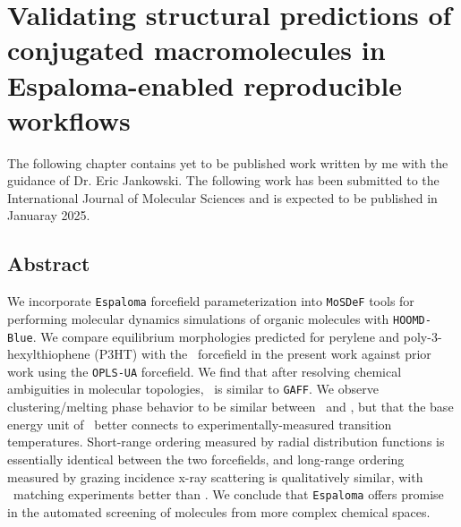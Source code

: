 \chapter{Validating structural predictions of conjugated macromolecules in Espaloma-enabled reproducible workflows}
The following chapter contains yet to be published work written by me with the guidance of Dr. Eric Jankowski. The following work has been submitted to the International Journal of Molecular Sciences and is expected to be published in Januaray 2025.
\label{chap:EspVal}

\section{Abstract}
We incorporate \texttt{Espaloma} forcefield parameterization into  \texttt{MoSDeF} tools for performing molecular dynamics simulations of organic molecules with \texttt{HOOMD-Blue}. 
We compare equilibrium morphologies predicted for perylene and poly-3-hexylthiophene (P3HT) with the \espff~forcefield in the present work against prior work using the \texttt{OPLS-UA} forcefield. 
We find that after resolving chemical ambiguities in molecular topologies, \espff~is similar to \texttt{GAFF}.
We observe clustering/melting phase behavior to be similar between \espff~and \oplsff, but that the base energy unit of \oplsff~better connects to experimentally-measured transition temperatures.
Short-range ordering measured by radial distribution functions is essentially identical between the two forcefields, and long-range ordering measured by grazing incidence x-ray scattering is qualitatively similar, with \espff~matching experiments better than \oplsff.
We conclude that \texttt{Espaloma} offers promise in the automated screening of molecules from more complex chemical spaces.
